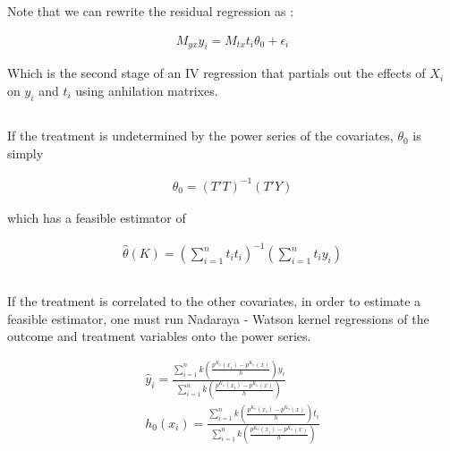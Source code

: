 \documentclass[12pt]{article}
\begin{document}
Note that we can rewrite the residual regression as :

\begin{gather*}
M_{yx} y_i = M_{tx} t_i \theta_0 + \epsilon_i
\end{gather*}

Which is the second stage of an IV regression that partials out the effects of $X_i$ on $y_i$ and $t_i$ using anhilation matrixes.

\subsection{}
\subsubsection{}

If the treatment is undetermined by the power series of the covariates, $\theta_0$ is simply

\begin{gather*}
\theta_0 = (T'T)^{-1}(T'Y)
\end{gather*}

which has a feasible estimator of

\begin{gather*}
\hat{\theta}(K) =(\sum\limits_{i=1}^{n} t_i t_i)^{-1}  (\sum\limits_{i=1}^{n} t_i y_i)\\
\end{gather*}










\subsubsection{}
If the treatment is correlated to the other covariates, in order to estimate a feasible estimator, one must run Nadaraya - Watson kernel regressions of the outcome and treatment variables onto the power series.

\begin{gather*}
\hat{y}_i = \frac{\sum\limits_{i=1}^{n} k\left(\frac{p^{K_n}(x_i) - p^{K_n}(x)}{h}\right) y_i}{\sum\limits_{i=1}^{n} k\left(\frac{p^{K_n}(x_i) - p^{K_n}(x)}{h}\right)} \\
h_0(x_i) = \frac{\sum\limits_{i=1}^{n} k\left(\frac{p^{K_n}(x_i) - p^{K_n}(x)}{h}\right) t_i}{\sum\limits_{i=1}^{n} k\left(\frac{p^{K_n}(x_i) - p^{K_n}(x)}{h}\right)}
\end{gather*}
\end{document}
